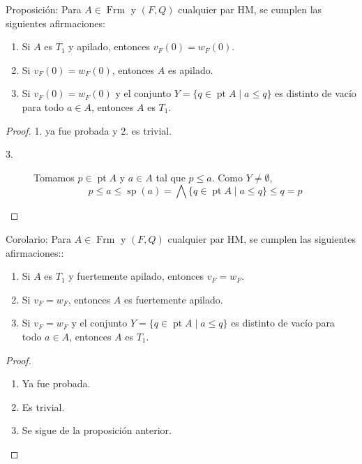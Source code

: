 \documentclass[compress,12pt]{beamer}
\DeclareMathOperator{\pt}{pt}
\DeclareMathOperator{\Sp}{sp}
\DeclareMathOperator{\Frm}{Frm}
\begin{document}
\begin{frame}
\begin{block}{Proposición:}
Para $A\in \Frm$ y $(F, Q)$ cualquier par HM, se cumplen las siguientes afirmaciones:
\begin{enumerate}
\item Si $A$ es $T_1$ y apilado, entonces $v_F(0)=w_F(0)$.
\item Si $v_F(0)=w_F(0)$, entonces $A$ es apilado.
\item Si $v_F(0)=w_F(0)$ y el conjunto $Y=\{q\in \pt A\mid a\leq q\}$ es distinto de vacío para todo $a\in A$, entonces $A$ es $T_1$.
\end{enumerate}
\end{block}

\begin{proof}
1. ya fue probada y 2. es trivial.
\begin{description}
\item[3.] Tomamos $p\in \pt A$ y $a\in A$ tal que $p\leq a$. Como $Y\neq \emptyset$,
\[
p\leq a \leq \Sp(a)=\bigwedge\{q\in \pt A\mid a\leq q\}\leq q=p
\]
\end{description}
\end{proof}
\end{frame}

\begin{frame}
\begin{block}{Corolario:}
Para $A\in \Frm$ y $(F, Q)$ cualquier par HM, se cumplen las siguientes afirmaciones::
\begin{enumerate}
\item Si $A$ es $T_1$ y fuertemente apilado, entonces $v_F=w_F$.
\item Si $v_F=w_F$, entonces $A$ es fuertemente apilado.
\item Si $v_F=w_F$ y el conjunto $Y=\{q\in \pt A\mid a\leq q\}$ es distinto de vacío para todo $a\in A$, entonces $A$ es $T_1$.
\end{enumerate}
\end{block}

\begin{proof}
\begin{enumerate}
  \item Ya fue probada.
  \item Es trivial.
  \item Se sigue de la proposición anterior.
\end{enumerate}
\end{proof}
\end{frame}
\end{document}
